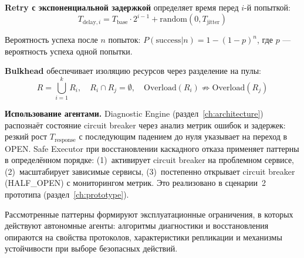 \textbf{Retry с экспоненциальной задержкой} определяет время перед $i$-й попыткой:
\begin{equation}
T_{\text{delay},i} = T_{\text{base}} \cdot 2^{i-1} + \text{random}(0, T_{\text{jitter}})
\label{eq:exponential_backoff}
\end{equation}

Вероятность успеха после $n$ попыток: $P(\text{success}|n) = 1 - (1 - p)^n$, где $p$ --- вероятность успеха одной попытки.

\textbf{Bulkhead} обеспечивает изоляцию ресурсов через разделение на пулы:
\begin{equation}
R = \bigcup_{i=1}^{k} R_i, \quad R_i \cap R_j = \emptyset, \quad \text{Overload}(R_i) \not\Rightarrow \text{Overload}(R_j)
\label{eq:bulkhead}
\end{equation}

\textbf{Использование агентами.} Diagnostic Engine (раздел~\ref{ch:architecture}) распознаёт состояние circuit breaker через анализ метрик ошибок и задержек: резкий рост $T_{\text{response}}$ с последующим падением до нуля указывает на переход в OPEN. Safe Executor при восстановлении каскадного отказа применяет паттерны в определённом порядке: (1)~активирует circuit breaker на проблемном сервисе, (2)~масштабирует зависимые сервисы, (3)~постепенно открывает circuit breaker (HALF\_OPEN) с мониторингом метрик. Это реализовано в сценарии~2 прототипа (раздел~\ref{ch:prototype}).

\medskip

Рассмотренные паттерны формируют эксплуатационные ограничения, в которых действуют автономные агенты: алгоритмы диагностики и восстановления опираются на свойства протоколов, характеристики репликации и механизмы устойчивости при выборе безопасных действий.
